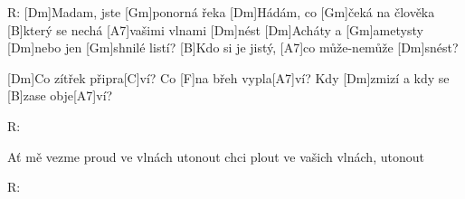 
R: [Dm]Madam, jste [Gm]ponorná řeka
[Dm]Hádám, co [Gm]\null čeká na člověka
[B]který se nechá [A7]vašimi vlnami [Dm]nést
[Dm]Acháty a [Gm]ametysty
[Dm]nebo jen [Gm]shnilé listí?
[B]Kdo si je jistý, [A7]co může-nemůže [Dm]snést?

[Dm]Co zítřek připra[C]ví?
Co [F]na břeh vypla[A7]ví?
Kdy [Dm]zmizí a kdy se [B]zase obje[A7]ví?

R:

Ať mě vezme proud
ve vlnách utonout
chci plout ve vašich vlnách, utonout

R:
